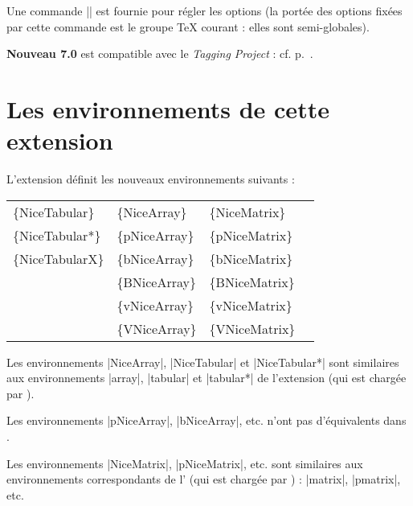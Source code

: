 \documentclass[dvipsnames]{article}%
\begin{document}
\medskip
{}
Une commande |\NiceMatrixOptions| est fournie pour régler les options (la portée
des options fixées par cette commande est le groupe TeX courant : elles sont
semi-globales).


\medskip
\colorbox{yellow!50}{\bfseries Nouveau 7.0}\enskip {} est
compatible avec le \emph{Tagging Project} : cf. p.~\pageref{Tagging Project}.

\newpage

\section{Les environnements de cette extension}




L'extension  définit les nouveaux environnements suivants :

\medskip
\begin{ttfamily}
\setlength{\tabcolsep}{3mm}
\begin{tabular}{llll}
\{NiceTabular\}  & \{NiceArray\}  & \{NiceMatrix\}   \\
\{NiceTabular*\} & \{pNiceArray\} & \{pNiceMatrix\}  \\
\{NiceTabularX\} & \{bNiceArray\} & \{bNiceMatrix\}  \\
                 & \{BNiceArray\} & \{BNiceMatrix\}  \\
                 & \{vNiceArray\} & \{vNiceMatrix\}  \\
                 & \{VNiceArray\} & \{VNiceMatrix\}
\end{tabular}
\end{ttfamily}


\medskip
Les environnements |{NiceArray}|, |{NiceTabular}| et |{NiceTabular*}| sont
similaires aux environnements |{array}|, |{tabular}| et |{tabular*}| de
l'extension  (qui est chargée par ).


\medskip
Les environnements |{pNiceArray}|, |{bNiceArray}|, etc. n'ont pas d'équivalents
dans .

\medskip
Les environnements |{NiceMatrix}|, |{pNiceMatrix}|, etc. sont similaires aux
environnements correspondants de l' (qui est chargée par
) : |{matrix}|, |{pmatrix}|, etc.
\end{document}
